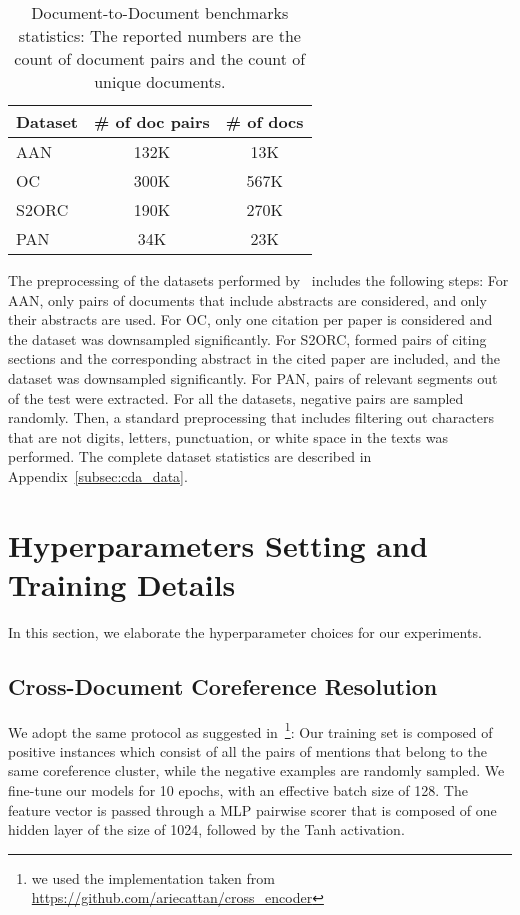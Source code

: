 \documentclass[11pt,a4paper]{article}
\begin{document}
\begin{table}[htp]
      \centering
          \small
  \def\arraystretch{1.2}\tabcolsep=12pt
\begin{tabular}{lcc}
\toprule
    Dataset& \# of doc pairs& \# of docs \\  \toprule
AAN         & 132K & 13K     \\ 
OC & 300K   & 567K    \\ 
S2ORC       & 190K    & 270K    \\
PAN         & 34K & 23K   \\
\toprule
\end{tabular}
\caption{Document-to-Document benchmarks statistics: The reported numbers are the count of document pairs and the count of unique documents.}
\label{tab:counts}
\end{table}
 The preprocessing of the datasets performed by~\citet{zhou-etal-2020-multilevel} includes the following steps: For AAN, only pairs of documents that include abstracts are considered, and only their abstracts are used. For OC, only one citation per paper is considered and the dataset was downsampled significantly. For S2ORC, formed pairs of citing sections and the corresponding abstract in the cited paper are included, and the dataset was downsampled significantly. For PAN, pairs of relevant segments out of the test were extracted. For all the datasets, negative pairs are sampled randomly. Then, a standard preprocessing that includes filtering out characters that are not digits, letters, punctuation, or white space in the texts was performed. The complete dataset statistics are described in Appendix~\ref{subsec:cda_data}. 

\section{Hyperparameters Setting and Training Details}

In this section, we elaborate the hyperparameter choices for our experiments.

\subsection{Cross-Document Coreference Resolution}
\label{subsec:app_coref}
We adopt the same protocol as suggested in~\citet{Cattan2020StreamliningCC}\footnote{we used the implementation taken from \url{https://github.com/ariecattan/cross_encoder}}: Our training set is composed of positive instances which consist of all the pairs of mentions that belong to the same coreference cluster, while the negative examples are randomly sampled. We fine-tune our models for 10 epochs, with an effective batch size of 128. The feature vector is passed through a MLP pairwise scorer that is composed of one hidden layer of the size of 1024, followed by the Tanh activation.
\end{document}
